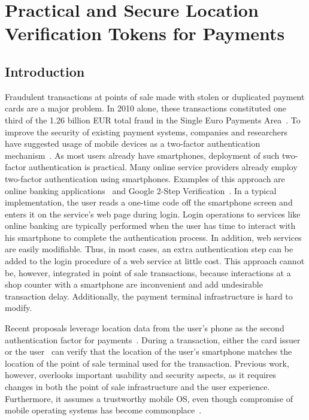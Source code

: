 \chapter[Practical and Secure Location Verification for Payments]{Practical and Secure Location Verification Tokens for Payments}
\label{chap:ps_tee}

\section{Introduction}

Fraudulent transactions at points of sale made with stolen or duplicated payment
cards are a major problem.  In 2010 alone, these transactions constituted one
third of the 1.26 billion EUR total fraud in the Single Euro Payments
Area~\cite{ECB2012}. To improve the security of existing payment systems,
companies and researchers have suggested usage of mobile devices as a
two-factor authentication mechanism~\cite{mastercardpatent, park09acsac}. As
most users already have smartphones, deployment of such two-factor
authentication is practical. Many online service providers already employ
two-factor authentication using smartphones.  Examples of this approach are
online banking applications~\cite{barclays_pinsentry} and Google 2-Step
Verification~\cite{google_authentication}.  In a typical implementation, the
user reads a one-time code off the smartphone screen and enters it on
the service's web page during login.  Login operations to services like online
banking are typically performed when the user has time to interact with his
smartphone to complete the authentication process. In addition, web services are
easily modifiable. Thus, in most cases, an extra authentication step can be
added to the login procedure of a web service at little cost. This approach
cannot be, however, integrated in point of sale transactions, because
interactions at a shop counter with a smartphone are inconvenient and add
undesirable transaction delay. Additionally, the payment terminal infrastructure
is hard to modify.

Recent proposals leverage location data from the user's phone as the second
authentication factor for payments~\cite{mastercardpatent,park09acsac}. During a
transaction, either the card issuer~\cite{mastercardpatent} or the
user~\cite{park09acsac} can verify that the location of the user's smartphone
matches the location of the point of sale terminal used for the transaction.
Previous work, however, overlooks important usability and security aspects, as
it requires changes in both the point of sale infrastructure and the user
experience. Furthermore, it assumes a trustworthy mobile OS, even though
compromise of mobile operating systems has become
commonplace~\cite{Felt11,zhou2012sp}.

